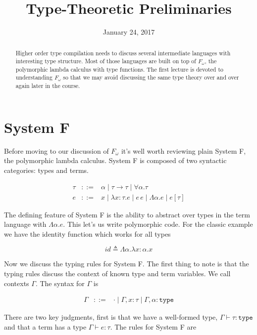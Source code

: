 \documentclass{article}
\title{Type-Theoretic Preliminaries}
\date{January 24, 2017}
\newcommand{\type}{\ensuremath{\mathtt{type}}}
\begin{document}
\maketitle

\begin{abstract}
  Higher order type compilation needs to discuss several intermediate languages
  with interesting type structure. Most of those languages are built on top of
  $F_\omega$, the polymorphic lambda calculus with type functions. The first
  lecture is devoted to understanding $F_\omega$ so that we may avoid discussing
  the same type theory over and over again later in the course.
\end{abstract}

\section{System F}

Before moving to our discussion of $F_\omega$ it's well worth
reviewing plain System F, the polymorphic lambda calculus. System F is
composed of two syntactic categories: types and terms.

\[
\begin{array}{lcl}
  \tau & ::= & \alpha \mid \tau \to \tau \mid \forall \alpha. \tau\\
  e & ::= & x \mid \lambda x : \tau. e \mid e \, e \mid
            \Lambda \alpha. e \mid e[\tau]
\end{array}
\]

The defining feature of System F is the ability to abstract over types
in the term language with $\Lambda \alpha. e$. This let's us write
polymorphic code. For the classic example we have the identity
function which works for all types

\[
  id \triangleq \Lambda \alpha. \lambda x : \alpha. x
\]

Now we discuss the typing rules for System F. The first thing to note
is that the typing rules discuss the context of known type and term
variables. We call contexts $\Gamma$. The syntax for $\Gamma$ is

\[
\begin{array}{lcl}
  \Gamma & ::= & \cdot \mid \Gamma, x : \tau \mid \Gamma, \alpha : \type
\end{array}
\]

There are two key
judgments, first is that we have a well-formed type, $\Gamma \vdash
\tau : \type$ and that a term has a type $\Gamma \vdash e : \tau$. The
rules for System F are
\end{document}
